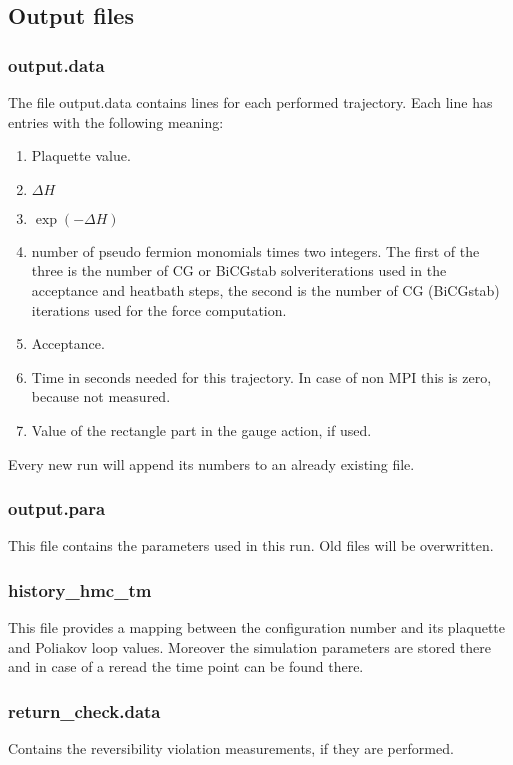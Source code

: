 \subsection{Output files}

\subsubsection*{\ttfamily output.data}

The file {\ttfamily output.data} contains lines for each performed
trajectory. Each line has entries with the following meaning:
\begin{enumerate}
\item Plaquette value.
\item $\Delta H$
\item $\exp(-\Delta H)$
\item number of pseudo fermion monomials times two integers. The first
  of the three is the number of CG or BiCGstab solveriterations used
  in the acceptance and heatbath steps, the second is the number of CG
  (BiCGstab) iterations used for the force computation.
\item Acceptance.
\item Time in seconds needed for this trajectory. In case of non MPI
  this is zero, because not measured.
\item Value of the rectangle part in the gauge action, if used.
\end{enumerate}
Every new run will append its numbers to an already existing file.

\subsubsection*{\ttfamily output.para}
This file contains the parameters used in this run. Old files will be
overwritten. 

\subsubsection*{\ttfamily history\_hmc\_tm}
This file provides a mapping between the configuration number and its
plaquette and Poliakov loop values. Moreover the simulation parameters
are stored there and in case of a reread the time point can be found there. 

\subsubsection*{\ttfamily return\_check.data}
Contains the reversibility violation measurements, if they are
performed. 

